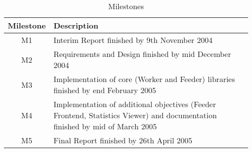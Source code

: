 \begin{table}[H]
\begin{tabularx}{\linewidth}{cX}
\toprule
\textbf{Milestone} & \textbf{Description} \\
\midrule
\endhead
M1 & Interim Report finished by 9th November 2004 \\
M2 & Requirements and Design finished by mid December 2004 \\
M3 & Implementation of core (Worker and Feeder) libraries finished by end February 2005 \\
M4 & Implementation of additional objectives (Feeder Frontend, Statistics Viewer) and documentation finished by mid of March 2005 \\
M5 & Final Report finished by 26th April 2005 \\
\bottomrule
\end{tabularx}
\caption{Milestones}
\label{tab:milestones}
\end{table}
